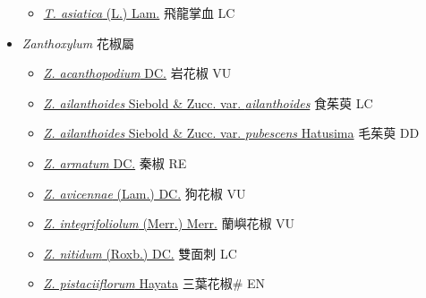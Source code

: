 \begin{itemize}
  \begin{itemize}
        \item[] \href{http://www.theplantlist.org/tpl1.1/search?q=Toddalia+asiatica}{\textit{T. asiatica} (L.) Lam.}   飛龍掌血 LC
  \end{itemize}
 \item[] \textit{Zanthoxylum} 花椒屬
                    
  \begin{itemize}
        \item[] \href{http://www.theplantlist.org/tpl1.1/search?q=Zanthoxylum+acanthopodium}{\textit{Z. acanthopodium} DC.}   岩花椒 VU
        \item[] \href{http://www.theplantlist.org/tpl1.1/search?q=Zanthoxylum+ailanthoides+var.+ailanthoides}{\textit{Z. ailanthoides} Siebold \& Zucc. var. \textit{ailanthoides}}   食茱萸 LC
        \item[] \href{http://www.theplantlist.org/tpl1.1/search?q=Zanthoxylum+ailanthoides+var.+pubescens}{\textit{Z. ailanthoides} Siebold \& Zucc. var. \textit{pubescens} Hatusima}   毛茱萸 DD
        \item[] \href{http://www.theplantlist.org/tpl1.1/search?q=Zanthoxylum+armatum}{\textit{Z. armatum} DC.}   秦椒 RE
        \item[] \href{http://www.theplantlist.org/tpl1.1/search?q=Zanthoxylum+avicennae}{\textit{Z. avicennae} (Lam.) DC.}   狗花椒 VU
        \item[] \href{http://www.theplantlist.org/tpl1.1/search?q=Zanthoxylum+integrifoliolum}{\textit{Z. integrifoliolum} (Merr.) Merr.}   蘭嶼花椒 VU
        \item[] \href{http://www.theplantlist.org/tpl1.1/search?q=Zanthoxylum+nitidum}{\textit{Z. nitidum} (Roxb.) DC.}   雙面刺 LC
        \item[] \href{http://www.theplantlist.org/tpl1.1/search?q=Zanthoxylum+pistaciiflorum}{\textit{Z. pistaciiflorum} Hayata}   三葉花椒\# EN

\end{itemize}
\end{itemize}
